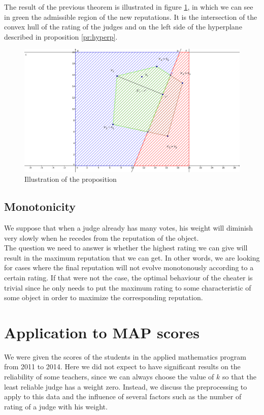 \documentclass[12pt,a4paper]{article}
\begin{document}
The result of the previous theorem is illustrated in figure \ref{hyperp}, in which we can see in green the admissible region of the new reputations. It is the intersection of the convex hull of the rating of the judges and on the left side of the hyperplane
described in proposition \ref{pr:hyperp}.
\begin{figure}[h!]
\centering
\includegraphics[width = 12cm]{geogebra/Hyperplane.png}
\caption{\label{hyperp}Illustration of the proposition}
\end{figure}
\FloatBarrier
\subsection{Monotonicity}
We suppose that when a judge already has many votes, his weight will diminish very slowly when he recedes from the reputation of the object.\\
The question we need to answer is whether the highest rating we can give will result in the maximum reputation that we can get. In other words, we are looking for cases where the final reputation will not evolve monotonously according to a certain rating. If that were not the case, the optimal behaviour of the cheater is trivial since he only needs to put the maximum rating to some characteristic of some object in order to maximize the corresponding reputation.




\section*{Application to MAP scores}
We were given the scores of the students in the applied mathematics program from 2011 to 2014. Here we did not expect to have significant results on the reliability of some teachers, since we can always choose the value of $k$ so that the least reliable judge has a weight zero. Instead, we discuss the preprocessing to apply to this data and the influence of several factors such as the number of rating of a judge with his weight.
\end{document}
